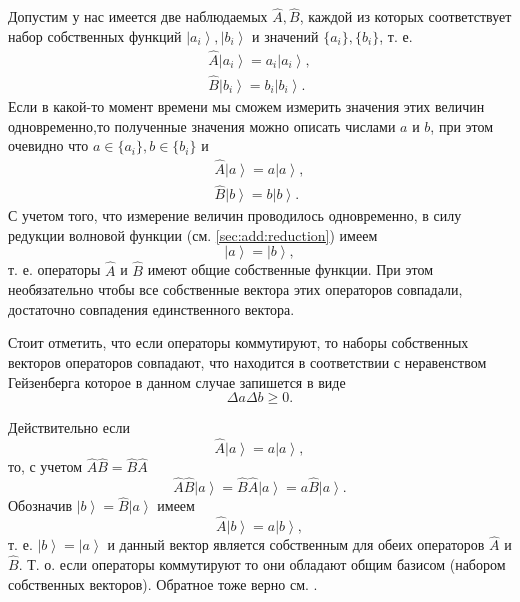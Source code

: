 Допустим у нас имеется две наблюдаемых $\hat{A}, \hat{B}$, каждой из
которых соответствует набор собственных функций $\left|a_i\right>,
\left|b_i\right>$ и значений $\{a_i\}, \{b_i\}$, т. е.
\begin{eqnarray}
  \hat{A}\left|a_i\right> = a_i \left|a_i\right>,
  \nonumber \\
  \hat{B}\left|b_i\right> = b_i \left|b_i\right>.
  \nonumber
\end{eqnarray}
Если в какой-то момент времени мы сможем измерить значения этих
величин одновременно,то полученные значения можно описать числами $a$
и $b$, при этом очевидно что $a \in \{a_i\}, b \in \{b_i\}$ и
\begin{eqnarray}
  \hat{A}\left|a\right> = a \left|a\right>,
  \nonumber \\
  \hat{B}\left|b\right> = b \left|b\right>.
  \nonumber
\end{eqnarray}
С учетом того, что измерение величин проводилось одновременно, в силу
редукции волновой функции (см. \autoref{sec:add:reduction}) имеем
\[
\left|a\right> = \left|b\right>,
\]
т. е. операторы $\hat{A}$ и $\hat{B}$ имеют общие собственные
функции. При этом необязательно чтобы все собственные вектора этих
операторов совпадали, достаточно совпадения единственного вектора.

Стоит отметить, что если операторы коммутируют, то наборы собственных
векторов операторов совпадают, что находится в соответствии с
неравенством Гейзенберга которое в данном случае запишется в виде
\[
\Delta a \Delta b \ge 0.
\]

Действительно если
\[
\hat{A} \left|a\right> = a \left|a\right>, 
\]
то, с учетом $\hat{A}\hat{B} = \hat{B}\hat{A}$
\[
\hat{A}\hat{B}\left|a\right> = 
\hat{B}\hat{A}\left|a\right> =
a \hat{B}\left|a\right>.
\]
Обозначив $\left|b\right> = \hat{B}\left|a\right>$ имеем
\[
\hat{A}\left|b\right> = 
a \left|b\right>,
\]
т. е.
$\left|b\right> = \left|a\right>$ и данный вектор является собственным
для обеих операторов $\hat{A}$ и  $\hat{B}$. Т. о. если операторы
коммутируют то они обладают общим базисом (набором собственных
векторов). Обратное тоже верно см. \cite{bHolevo2016}.
